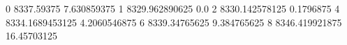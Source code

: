 0 8337.59375 7.630859375
1 8329.962890625 0.0
2 8330.142578125 0.1796875
4 8334.1689453125 4.2060546875
6 8339.34765625 9.384765625
8 8346.419921875 16.45703125
